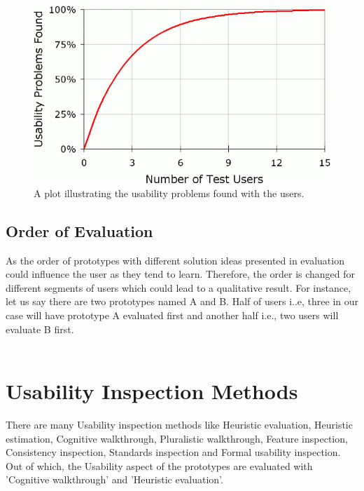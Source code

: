 \begin{figure}[hbt!]
	\centering
	\includegraphics[width=\linewidth]{figures/fiveplot}
	\caption{A plot illustrating the usability problems found with the users.}
	\label{fig:5plot}
\end{figure}

\subsection{Order of Evaluation}

As the order of prototypes with different solution ideas presented in evaluation could influence the user as they tend to learn. Therefore, the order is changed for different segments of users which could lead to a qualitative result. For instance, let us say there are two prototypes named A and B. Half of users i..e, three in our case will have prototype A evaluated first and another half i.e., two users will evaluate B first. \\ \\

\section{Usability Inspection Methods}

There are many Usability inspection methods \cite{nielsen1994usability} like Heuristic evaluation, Heuristic estimation, Cognitive walkthrough, Pluralistic walkthrough, Feature inspection, Consistency inspection, Standards inspection and Formal usability inspection.  Out of which, the Usability aspect of the prototypes are evaluated with  'Cognitive walkthrough' and 'Heuristic evaluation'. \\ \\


